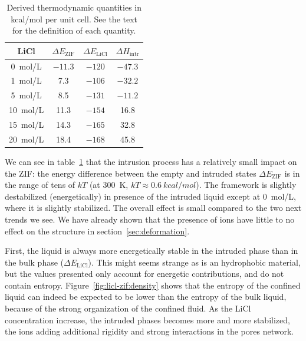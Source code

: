 \documentclass[thesis]{subfiles}
\begin{document}
\begin{table}[ht]
    \caption{Derived thermodynamic quantities in kcal/mol per unit cell. See
    the text for the definition of each quantity.}
    \label{table:thermo}
    \centering
    \renewcommand{\arraystretch}{1.3}
    \begin{tabular}{c | c c c }
        \toprule
        \bf LiCl       & $\Delta E_\text{ZIF}$ & $\Delta E_\text{LiCl}$ & $\Delta H_\text{intr}$ \\
        \midrule
        \SI{0}{mol/L}  &    $-11.3$            &    $-120$                &    $-47.3$               \\
        \SI{1}{mol/L}  &       7.3             &    $-106$                &    $-32.2$               \\
        \SI{5}{mol/L}  &       8.5             &    $-131$                &    $-11.2$               \\
        \SI{10}{mol/L} &      11.3             &    $-154$                &     16.8               \\
        \SI{15}{mol/L} &      14.3             &    $-165$                &     32.8               \\
        \SI{20}{mol/L} &      18.4             &    $-168$                &     45.8               \\
        \bottomrule
    \end{tabular}
\end{table}

We can see in table~\ref{table:thermo} that the intrusion process has a
relatively small impact on the ZIF: the energy difference between the empty and
intruded states $\Delta E_\text{ZIF}$ is in the range of tens of $kT$ (at 300~K,
$kT \approx \SI{0.6}{kcal/mol}$). The  framework is slightly destabilized
(energetically) in presence of the intruded liquid except at \SI{0}{mol/L},
where it is slightly stabilized. The overall effect is small compared to the two
next trends we see. We have already shown that the presence of ions have little
to no effect on the  structure in section~\ref{sec:deformation}.

First, the liquid is always more energetically stable in the intruded phase than
in the bulk phase ($\Delta E_\text{LiCl}$). This might seems strange as  is
an hydrophobic material, but the values presented only account for energetic
contributions, and do not contain entropy. Figure~\ref{fig:licl-zif:density} shows that
the entropy of the confined liquid can indeed be expected to be lower than the
entropy of the bulk liquid, because of the strong organization of the confined
fluid. As the LiCl concentration increase, the intruded phases becomes more and
more stabilized, the ions adding additional rigidity and strong interactions in
the pores network.
\end{document}
